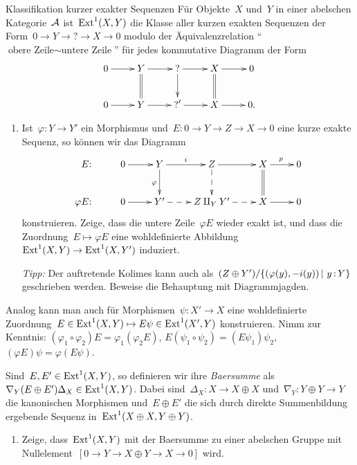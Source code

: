 \documentclass{uebblatt}
\begin{document}
\newpage
\begin{aufgabe}{Klassifikation kurzer exakter Sequenzen}
Für Objekte~$X$ und~$Y$ in einer abelschen Kategorie~$\mathcal{A}$ ist~$\mathrm{Ext}^1(X,Y)$ die
Klasse aller kurzen exakten Sequenzen der Form~$0 \to Y \to {?} \to X \to 0$
modulo der Äquivalenzrelation "`$\text{obere Zeile} \sim \text{untere Zeile}$"'
für jedes kommutative Diagramm der Form
\[ \xymatrix{
  0 \ar[r] & Y \ar[r] \ar@{=}[d] & {?} \ar[r]\ar[d] & X \ar[r]\ar@{=}[d] & 0 \\
  0 \ar[r] & Y \ar[r] & {?}' \ar[r] & X \ar[r] & 0. \\
} \]
\begin{enumerate}
\item Ist~$\varphi : Y \to Y'$ ein Morphismus und~$E : 0 \to Y \to Z \to X
\to 0$ eine kurze exakte Sequenz, so können wir das Diagramm
\[ \xymatrix{
  {}\phantom{\varphi}E{:} & 0 \ar[r] & Y \ar[r]^i \ar[d]_{\varphi} & Z \ar[r]\ar@{-->}[d] & X \ar[r]^p\ar@{=}[d] & 0 \\
  \varphi E{:} & 0 \ar[r] & Y' \ar@{-->}[r] & Z \amalg_Y Y' \ar@{-->}[r] & X \ar[r] & 0
} \]
konstruieren. Zeige, dass die untere Zeile~$\varphi E$ wieder exakt ist, und dass die
Zuordnung~$E \mapsto \varphi E$ eine wohldefinierte Abbildung~$\mathrm{Ext}^1(X,Y) \to
\mathrm{Ext}^1(X,Y')$ induziert.

{\scriptsize\emph{Tipp:} Der auftretende Kolimes kann auch als~$(Z \oplus Y') /
\{ (\varphi(y), -i(y)) \,|\ y\,{:}\,Y \}$ geschrieben werden. Beweise die Behauptung
mit Diagrammjagden.\par}
\end{enumerate}
Analog kann man auch für Morphismen~$\psi : X' \to X$ eine wohldefinierte
Zuordnung~$E \in \mathrm{Ext}^1(X,Y) \mapsto E \psi \in \mathrm{Ext}^1(X',Y)$ konstruieren.
Nimm zur Kenntnis: $(\varphi_1 \circ \varphi_2) E =
\varphi_1(\varphi_2 E)$, $E (\psi_1 \circ \psi_2) = (E \psi_1) \psi_2$,
$(\varphi E) \psi = \varphi (E \psi)$.

Sind~$E,E' \in \mathrm{Ext}^1(X,Y)$, so definieren wir ihre \emph{Baersumme}
als~$\nabla_Y (E \oplus E') \Delta_X \in \mathrm{Ext}^1(X,Y)$. Dabei sind~$\Delta_X : X
\to X \oplus X$ und~$\nabla_Y : Y \oplus Y \to Y$ die kanonischen Morphismen
und~$E \oplus E'$ die sich durch direkte Summenbildung ergebende Sequenz
in~$\mathrm{Ext}^1(X \oplus X, Y \oplus Y)$.

\begin{enumerate}
\addtocounter{enumi}{1}
\item Zeige, dass~$\mathrm{Ext}^1(X,Y)$ mit der Baersumme zu einer abelschen Gruppe mit
Nullelement~$[0 \to Y \to X \oplus Y \to X \to 0]$ wird.
\end{enumerate}

\end{aufgabe}
\end{document}

